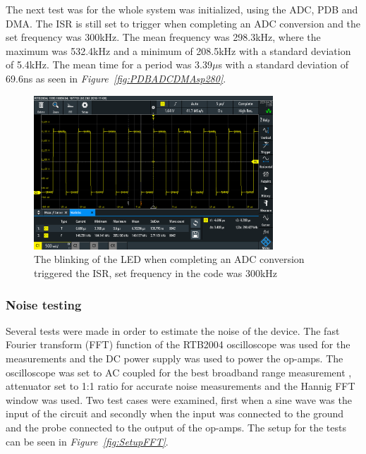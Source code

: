 The next test was for the whole system was initialized, using the ADC, PDB and DMA.
The ISR is still set to trigger when completing an ADC conversion and the set frequency was 300kHz.
The mean frequency was 298.3kHz, where the maximum was 532.4kHz and a minimum of 208.5kHz with a standard deviation of 5.4kHz. 
The mean time for a period was 3.39$\mu$s with a standard deviation of 69.6ns as seen in \textit{Figure~\ref{fig:PDBADCDMAsp280}}.

\begin{figure}[h]
    \centering
    \includegraphics[width=0.8\textwidth]{graphics/ALLT300k.PNG}
    \caption{The blinking of the LED when completing an ADC conversion triggered the ISR, set frequency in the code was 300kHz}
    \label{fig:PDBADCDMAsp300}
\end{figure}





\subsubsection{Noise testing}


Several tests were made in order to estimate the noise of the device.
The fast Fourier transform (FFT) function of the RTB2004 oscilloscope was used for the measurements and the DC power supply was used to power the op-amps.
The oscilloscope was set to AC coupled for the best broadband range measurement%
, attenuator set to 1:1 ratio %
for accurate noise measurements and the Hannig FFT window was used.
Two test cases were examined, first when a sine wave was the input of the circuit and secondly when the input was connected to the ground and the probe connected to the output of the op-amps.
The setup for the tests can be seen in \textit{Figure~\ref{fig:SetupFFT}}.

